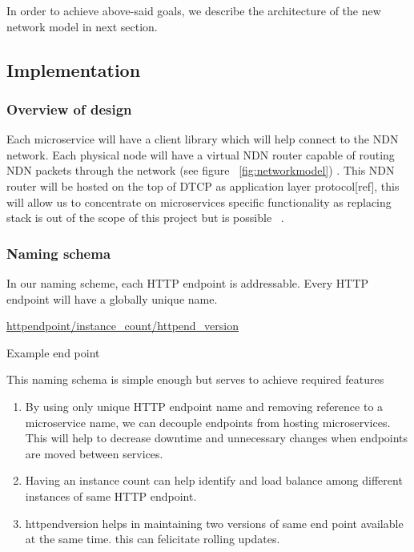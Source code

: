  In order to achieve above-said goals, we describe the architecture of the new network model in next section.
 
\subsection{Implementation}
\subsubsection{Overview of design }

Each microservice will have a client library which will help connect to the NDN network. Each physical node will have a virtual NDN router capable of routing NDN packets through the network (see figure  ~\ref{fig:networkmodel}) . This NDN router will be hosted on the top of DTCP as application layer protocol[ref], this will allow us to concentrate on microservices specific functionality as replacing stack is out of the scope of this project but is possible  ~\cite{zhang2014named}. 

\subsubsection{Naming schema}

In our naming scheme, each HTTP endpoint is addressable. Every HTTP endpoint will have a globally unique name. 

\begin{center} \url{ httpendpoint/instance_count/httpend_version  } \end{center}
\begin{center} Example end point \end{center}


This naming schema is simple enough but serves to achieve required features
\begin{enumerate}
\item By using only unique HTTP endpoint name and removing reference to a microservice name, we can decouple endpoints from hosting microservices. This will help to decrease downtime and unnecessary changes when endpoints are moved between services.
\item  Having an instance count can help identify and load balance among different instances of same HTTP endpoint.
\item httpendversion helps in maintaining two versions of same end point available at the same time. this can felicitate rolling updates.  
\end{enumerate}


